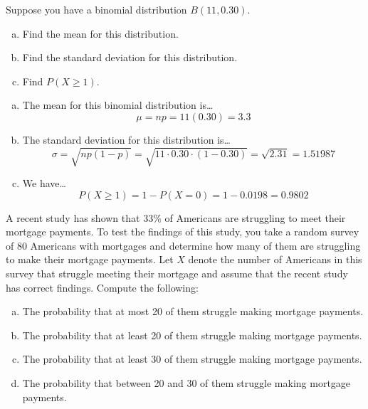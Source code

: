 \documentclass[11pt,letterpaper]{article}
\begin{document}

 Suppose you have a binomial distribution $B(11, 0.30)$. 
	\begin{enumerate}[(a)]
	\item Find the mean for this distribution. 
	\item Find the standard deviation for this distribution. 
	\item Find $P(X \geq 1)$. 
	\end{enumerate} \pspace

\sol 
\begin{enumerate}[(a)]
\item The mean for this binomial distribution is\dots
	\[
	\mu= np= 11(0.30)= 3.3
	\] \pspace

\item The standard deviation for this distribution is\dots
	\[
	\sigma= \sqrt{np(1 - p)}= \sqrt{11 \cdot 0.30 \cdot (1 - 0.30)}= \sqrt{2.31}= 1.51987
	\] \pspace

\item We have\dots
	\[
	P(X \geq 1)= 1 - P(X= 0)= 1 - 0.0198= 0.9802
	\]
\end{enumerate}



\newpage



 A recent study has shown that 33\% of Americans are struggling to meet their mortgage payments. To test the findings of this study, you take a random survey of 80 Americans with mortgages and determine how many of them are struggling to make their mortgage payments. Let $X$ denote the number of Americans in this survey that struggle meeting their mortgage and assume that the recent study has correct findings. Compute the following:
	\begin{enumerate}[(a)]
	\item The probability that at most 20 of them struggle making mortgage payments. 
	\item The probability that at least 20 of them struggle making mortgage payments. 
	\item The probability that at least 30 of them struggle making mortgage payments. 
	\item The probability that between 20 and 30 of them struggle making mortgage payments. 
	\end{enumerate} \pspace
\end{document}
